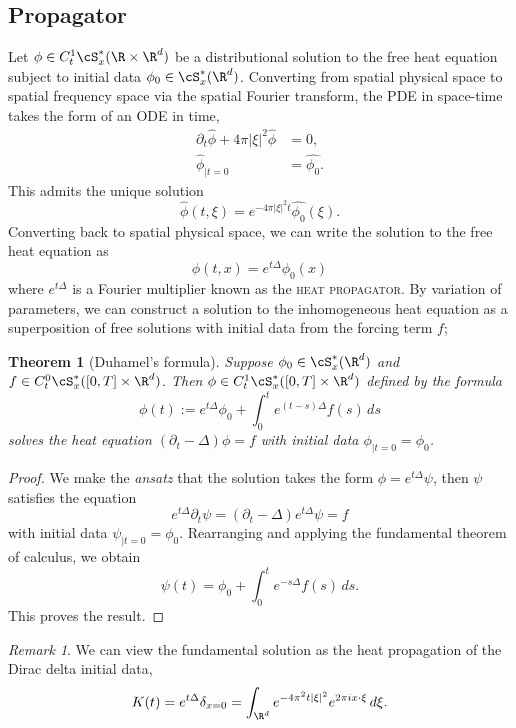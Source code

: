 \documentclass[reqno]{amsart}
\newtheorem{theorem}{Theorem}
\theoremstyle{definition}
\theoremstyle{remark}
\newtheorem*{remark}{Remark}
\renewcommand{\emph}{\textsc}
\begin{document}
\subsection{Propagator}

Let $\phi \in C^1_t \cS_x^* (\R \times \R^d)$ be a distributional solution to the free heat equation subject to initial data $\phi_0 \in \cS_x^* (\R^d)$. Converting from spatial physical space to spatial frequency space via the spatial Fourier transform, the PDE in space-time takes the form of an ODE in time, 
	\begin{align*}
		\partial_t \widehat \phi + 4\pi |\xi|^2 \widehat \phi
			&= 0, \\
		\widehat \phi_{|t = 0}
			&= \widehat{\phi_0}.
	\end{align*}
This admits the unique solution 
	\[ \widehat \phi (t, \xi) = e^{-4\pi |\xi|^2 t} \widehat{\phi_0} (\xi). \]	
Converting back to spatial physical space, we can write the solution to the free heat equation as 
	\[ \phi(t, x) = e^{t \Delta} \phi_0 (x) \]	
where $e^{t \Delta}$ is a Fourier multiplier known as the \emph{heat propagator}. By variation of parameters, we can construct a solution to the inhomogeneous heat equation as a superposition of free solutions with initial data from the forcing term $f$;

\begin{theorem}[Duhamel's formula]
	Suppose $\phi_0 \in \cS^*_x (\R^d)$ and $f \in C^0_t \cS_x^* ([0, T] \times \R^d)$. Then $\phi \in C^1_t \cS_x^* ([0, T] \times \R^d)$ defined by the formula
		\[ \phi(t) := e^{t \Delta} \phi_0 +  \int_0^t e^{(t - s) \Delta} f(s) \, ds \]
	solves the heat equation $(\partial_t - \Delta) \phi = f$ with initial data $\phi_{|t = 0} = \phi_0$. 	
\end{theorem}

\begin{proof}
	We make the \textit{ansatz} that the solution takes the form $\phi = e^{t \Delta} \psi$, then $\psi$ satisfies the equation 
		\[ e^{t \Delta} \partial_t \psi = (\partial_t - \Delta) e^{t \Delta} \psi = f \]
	with initial data $\psi_{|t = 0} = \phi_0$. Rearranging and applying the fundamental theorem of calculus, we obtain 
		\[ \psi(t) = \phi_0 + \int_0^t e^{-s \Delta} f(s) \, ds.  \]
	This proves the result. 		
\end{proof}	

\begin{remark}
	We can view the fundamental solution as the heat propagation of the Dirac delta initial data, 
		\[ K(t) = e^{t \Delta} \delta_{x = 0} = \int_{\R^d} e^{-4\pi^2 t|\xi|^2} e^{2\pi i x \cdot \xi} \, d\xi. \]
\end{remark}
\end{document}
